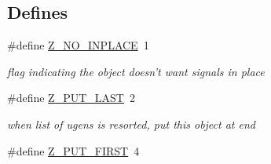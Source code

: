 \subsection*{Defines}
\begin{DoxyCompactItemize}
\item 
\hypertarget{group__msp_ga15695d5ba6bd17ae2e4ac01fff6d2b32}{
\#define \hyperlink{group__msp_ga15695d5ba6bd17ae2e4ac01fff6d2b32}{Z\_\-NO\_\-INPLACE}~1}
\label{group__msp_ga15695d5ba6bd17ae2e4ac01fff6d2b32}

\begin{DoxyCompactList}\small\item\em flag indicating the object doesn't want signals in place \item\end{DoxyCompactList}\item 
\hypertarget{group__msp_ga38363d9e8d77f8f0fcec1a7a1d008977}{
\#define \hyperlink{group__msp_ga38363d9e8d77f8f0fcec1a7a1d008977}{Z\_\-PUT\_\-LAST}~2}
\label{group__msp_ga38363d9e8d77f8f0fcec1a7a1d008977}

\begin{DoxyCompactList}\small\item\em when list of ugens is resorted, put this object at end \item\end{DoxyCompactList}\item 
\hypertarget{group__msp_gafd451e217e2ffd6b8e158b8861fcf866}{
\#define \hyperlink{group__msp_gafd451e217e2ffd6b8e158b8861fcf866}{Z\_\-PUT\_\-FIRST}~4}
\label{group__msp_gafd451e217e2ffd6b8e158b8861fcf866}


\end{DoxyCompactItemize}
